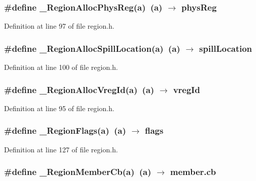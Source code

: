 \subsubsection{\setlength{\rightskip}{0pt plus 5cm}\#define \_\-Region\-Alloc\-Phys\-Reg(a)~(a) $\rightarrow$ phys\-Reg}\label{region_8h_6b4d7e7649921a998dfdf03bd0655903}




Definition at line 97 of file region.h.
\subsubsection{\setlength{\rightskip}{0pt plus 5cm}\#define \_\-Region\-Alloc\-Spill\-Location(a)~(a) $\rightarrow$ spill\-Location}\label{region_8h_0b0abfc8a423eb78dca915af77ca72b5}




Definition at line 100 of file region.h.
\subsubsection{\setlength{\rightskip}{0pt plus 5cm}\#define \_\-Region\-Alloc\-Vreg\-Id(a)~(a) $\rightarrow$ vreg\-Id}\label{region_8h_45922364a29553c7354d8edb327e2963}




Definition at line 95 of file region.h.
\subsubsection{\setlength{\rightskip}{0pt plus 5cm}\#define \_\-Region\-Flags(a)~(a) $\rightarrow$ flags}\label{region_8h_454159d4fc145df49b5e0f1944c5122d}




Definition at line 127 of file region.h.
\subsubsection{\setlength{\rightskip}{0pt plus 5cm}\#define \_\-Region\-Member\-Cb(a)~(a) $\rightarrow$ member.cb}\label{region_8h_b6ae7996592900bc156507e855769405}




